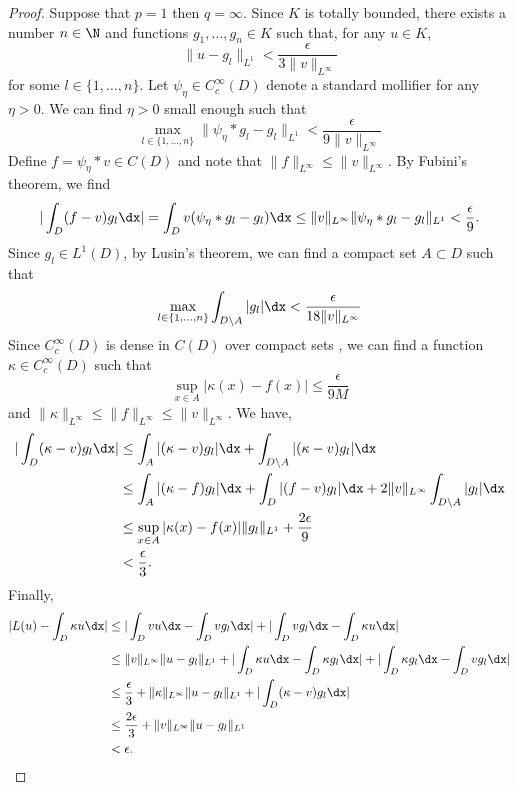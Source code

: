 \begin{proof}
Suppose that \(p=1\) then \(q=\infty\). Since \(K\) is totally bounded, there exists a number
\(n \in \N\) and functions \(g_1,\dots,g_n \in K\) such that, for any \(u \in K\),
\[\|u - g_l\|_{L^1} < \frac{\epsilon}{3 \|v\|_{L^\infty}}\]
for some \(l \in \{1,\dots,n\}\). Let \(\psi_\eta \in C^\infty_c (D)\) denote a standard mollifier
for any \(\eta > 0\). We can find \(\eta > 0\) small enough such that
\[\max_{l \in \{1,\dots,n\}} \|\psi_\eta * g_l - g_l\|_{L^1} < \frac{\epsilon}{9 \|v\|_{L^\infty}}\]
Define \(f = \psi_\eta * v \in C(D)\) and note that \(\|f\|_{L^\infty} \leq \|v\|_{L^\infty}\). By Fubini's theorem, we find
\[|\int_D (f - v)g_l \dx| = \int_D v ( \psi_\eta * g_l - g_l) \dx \leq \|v\|_{L^\infty} \|\psi_\eta * g_l - g_l\|_{L^1} < \frac{\epsilon}{9}.\]
Since \(g_l \in L^1 (D)\), by Lusin's theorem, we can find a compact set \(A \subset D\) such that
\[\max_{l \in \{1,\dots,n\}}  \int_{D \setminus A} |g_l| \dx < \frac{\epsilon}{18 \|v\|_{L^\infty}}\]
Since \(C^\infty_c (D)\) is dense in \(C(D)\) over compact sets \cite[Theorem C.16]{leoni2009first}, we can find a function \(\kappa \in C^\infty_c (D)\) such that
\[\sup_{x \in A} |\kappa(x) - f(x)| \leq \frac{\epsilon}{9M}\]
and \(\|\kappa\|_{L^\infty} \leq \|f\|_{L^\infty} \leq \|v\|_{L^\infty}\).
We have,
\begin{align*}
|\int_D (\kappa - v) g_l \dx| &\leq \int_A |(\kappa - v)g_l| \dx + \int_{D \setminus A} |(\kappa - v)  g_l | \dx\\
&\leq \int_A |(\kappa - f)g_l| \dx + \int_D |(f-v)g_l| \dx + 2 \|v\|_{L^\infty} \int_{D \setminus A} |g_l| \dx \\
&\leq \sup_{x \in A} |\kappa(x) - f(x)| \|g_l\|_{L^1} + \frac{2\epsilon}{9}   \\ 
&< \frac{\epsilon}{3}.
\end{align*}
Finally,
\begin{align*}
|L(u) - \int_{D} \kappa u \dx| &\leq |\int_D vu \dx - \int_D vg_l \dx| + |\int_D v g_l \dx - \int_D \kappa u \dx| \\
&\leq \|v\|_{L^\infty} \|u- g_l\|_{L^1} + |\int_D \kappa u \dx - \int_D \kappa g_l \dx | + | \int_D \kappa g_l \dx - \int_D v g_l \dx| \\
&\leq \frac{\epsilon}{3} + \|\kappa\|_{L^\infty} \|u - g_l\|_{L^1} + |\int_D (\kappa - v) g_l  \dx| \\
&\leq \frac{2\epsilon}{3} + \|v\|_{L^\infty} \|u-g_l\|_{L^1} \\
&< \epsilon.
\end{align*}


\end{proof}
